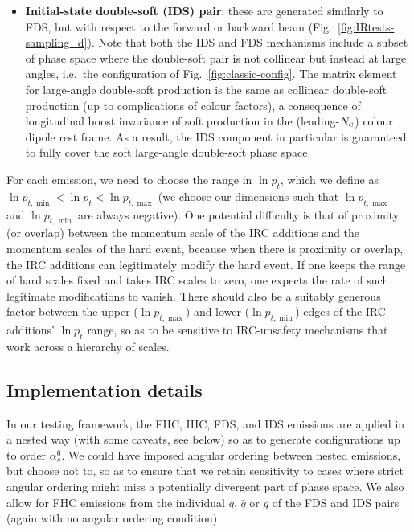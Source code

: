 \documentclass[nofootinbib,twocolumn,preprintnumbers,superscriptaddress,aps]{revtex4-2}
\newcommand{\as}{\alpha_s}
\newcommand{\lnptmin}{\ln p_{t,\min}}
\newcommand{\lnptmax}{\ln p_{t,\max}}
\newcommand{\NC}{N_\text{\textsc{c}}}
\begin{document}
\begin{itemize}
\item
  \textbf{Initial-state double-soft (IDS) pair}:
  these are generated similarly to FDS, but with respect to the
  forward or backward beam (Fig.~\ref{fig:IRtests-sampling_d}).
  Note that both the IDS and FDS mechanisms include a subset
  of phase space where the double-soft pair is not collinear but
  instead at large angles, i.e.\ the configuration of
  Fig.~\ref{fig:classic-config}.
  The matrix element for large-angle double-soft production is the
  same as collinear double-soft production (up to complications of
  colour factors), a consequence of longitudinal boost invariance of
  soft production in the (leading-$\NC$) colour dipole rest frame.
  As a result, the IDS component in particular is guaranteed to fully
  cover the soft large-angle double-soft phase space.
\end{itemize}


For each emission, we need to choose the range in $\ln p_t$, which we
define as $\lnptmin < \ln p_t < \lnptmax$ (we choose our dimensions
such that $\lnptmax$ and $\lnptmin$ are always negative).
%
One potential difficulty is that of proximity (or overlap) between the
momentum scale of the IRC additions and the momentum scales of the
hard event, because when there is proximity or overlap, the IRC
additions can legitimately modify the hard event. 
%
If one keeps the range of hard scales fixed and takes IRC scales to
zero, one expects the rate of such legitimate modifications to vanish.
%
There should also be a suitably generous factor between the upper ($\lnptmax$) and
lower ($\lnptmin$) edges of the IRC additions' $\ln p_t$ range, so as
to be sensitive to IRC-unsafety mechanisms that work across a
hierarchy of scales.



\subsection{Implementation details}

In our testing framework, the FHC, IHC, FDS, and IDS emissions are applied in a nested way (with some caveats, see
below) so as to generate configurations up to order $\as^6$.
%
We could have imposed angular ordering between nested emissions, but
choose not to, so as to ensure that we retain sensitivity to cases
where strict angular ordering might miss a potentially divergent part
of phase space.
%
We also allow for FHC emissions from the individual $q$, $\bar q$ or
$g$ of the FDS and IDS pairs (again with no angular ordering
condition).
\end{document}
